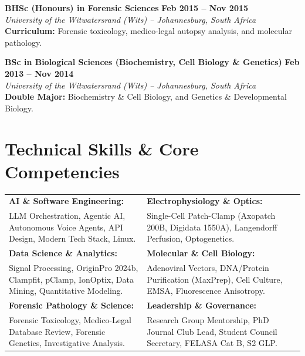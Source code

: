 \documentclass[10pt,a4paper]{article}
\begin{document}
\noindent
\textbf{BHSc (Honours) in Forensic Sciences} \hfill \textbf{Feb 2015 -- Nov 2015} \\
\textit{University of the Witwatersrand (Wits) -- Johannesburg, South Africa} \\
\small{\textbf{Curriculum:} Forensic toxicology, medico-legal autopsy analysis, and molecular pathology.} \vspace{4pt}

\noindent
\textbf{BSc in Biological Sciences (Biochemistry, Cell Biology \& Genetics)} \hfill \textbf{Feb 2013 -- Nov 2014} \\
\textit{University of the Witwatersrand (Wits) -- Johannesburg, South Africa} \\
\small{\textbf{Double Major:} Biochemistry \& Cell Biology, and Genetics \& Developmental Biology.}

\section{Technical Skills \& Core Competencies}
\begin{tcolorbox}[colback=bglight, colframe=bordergray, arc=3pt, boxrule=0.5pt, top=4pt, bottom=4pt, left=6pt, right=6pt]
\begin{tabularx}{\textwidth}{@{}X X@{}}
\textbf{\color{primary} AI \& Software Engineering:} & \textbf{\color{primary} Electrophysiology \& Optics:} \\
LLM Orchestration, Agentic AI, Autonomous Voice Agents, API Design, Modern Tech Stack, Linux. & Single-Cell Patch-Clamp (Axopatch 200B, Digidata 1550A), Langendorff Perfusion, Optogenetics. \\[4pt]
\textbf{\color{primary} Data Science \& Analytics:} & \textbf{\color{primary} Molecular \& Cell Biology:} \\
Signal Processing, OriginPro 2024b, Clampfit, pClamp, IonOptix, Data Mining, Quantitative Modeling. & Adenoviral Vectors, DNA/Protein Purification (MaxPrep), Cell Culture, EMSA, Fluorescence Anisotropy. \\[4pt]
\textbf{\color{primary} Forensic Pathology \& Science:} & \textbf{\color{primary} Leadership \& Governance:} \\
Forensic Toxicology, Medico-Legal Database Review, Forensic Genetics, Investigative Analysis. & Research Group Mentorship, PhD Journal Club Lead, Student Council Secretary, FELASA Cat B, S2 GLP.
\end{tabularx}
\end{tcolorbox}
\end{document}
